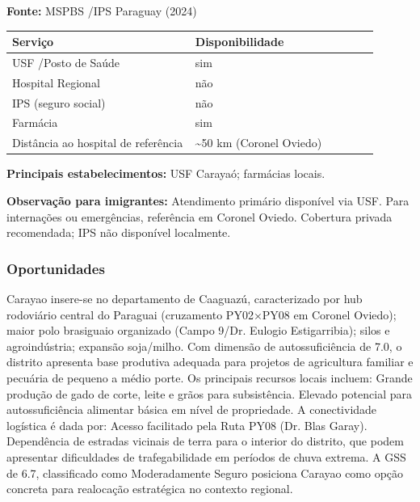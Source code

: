 \textbf{Fonte:} MSPBS /\allowbreak  IPS Paraguay (2024)

{\def\LTcaptype{none} %
\begin{longtable}{@{}>{\raggedright\arraybackslash}p{0.45\linewidth} >{\raggedright\arraybackslash}p{0.45\linewidth}@{}}
\toprule\noalign{}
Serviço & Disponibilidade \\
\midrule\noalign{}
\endhead
\bottomrule\noalign{}
\endlastfoot
USF /\allowbreak  Posto de Saúde & sim \\
Hospital Regional & não \\
IPS (seguro social) & não \\
Farmácia & sim \\
Distância ao hospital de referência & \textasciitilde50 km (Coronel
Oviedo) \\
\end{longtable}
}

\textbf{Principais estabelecimentos:} USF Carayaó; farmácias locais.

\textbf{Observação para imigrantes:} Atendimento primário disponível via
USF. Para internações ou emergências, referência em Coronel Oviedo.
Cobertura privada recomendada; IPS não disponível localmente.
\newpage

\subsubsection*{Oportunidades}\label{oport-carayao-0503}
Carayao insere-se no departamento de Caaguazú, caracterizado por hub rodoviário central do Paraguai (cruzamento PY02×PY08 em Coronel Oviedo); maior polo brasiguaio organizado (Campo 9/Dr. Eulogio Estigarribia); silos e agroindústria; expansão soja/milho. Com dimensão de autossuficiência de 7.0, o distrito apresenta base produtiva adequada para projetos de agricultura familiar e pecuária de pequeno a médio porte. Os principais recursos locais incluem: Grande produção de gado de corte, leite e grãos para subsistência. Elevado potencial para autossuficiência alimentar básica em nível de propriedade. A conectividade logística é dada por: Acesso facilitado pela Ruta PY08 (Dr. Blas Garay). Dependência de estradas vicinais de terra para o interior do distrito, que podem apresentar dificuldades de trafegabilidade em períodos de chuva extrema. A GSS de 6.7, classificado como Moderadamente Seguro posiciona Carayao como opção concreta para realocação estratégica no contexto regional.

